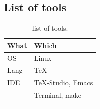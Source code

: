 \documentclass[a4paper,12pt,titlepage,fullpage]{article} %
\begin{document}
\subsection{List of tools}
\begin{table}[h]
	\begin{tabularx}{\textwidth}{|l|X|}
		\hline
		What & Which \\
		\hline
		OS & Linux \\
		\hline
		Lang & \TeX \\
		\hline
		IDE & \TeX-Studio, Emacs\\
		\hline
		& Terminal, make \\
		\hline
		& \\
		\hline
	\end{tabularx}
	\caption{list of tools.}
\end{table}


\end{document}
